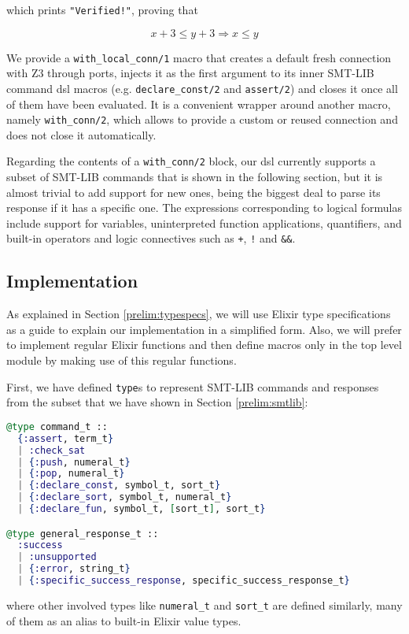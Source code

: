 which prints \verb|"Verified!"|, proving that 

$$x + 3\leq y + 3 \Rightarrow x \leq y$$

We provide a \verb|with_local_conn/1| macro that creates a default fresh
connection with Z3 through ports, injects it as the first argument to its inner
SMT-LIB command \gls{dsl} macros (e.g. \verb|declare_const/2| and
\verb|assert/2|) and closes it once all of them have been evaluated. It is a
convenient wrapper around another macro, namely \verb|with_conn/2|, which allows
to provide a custom or reused connection and does not close it automatically.

Regarding the contents of a \verb|with_conn/2| block, our \gls{dsl} currently
supports a subset of SMT-LIB commands that is shown in the following section,
but it is almost trivial to add support for new ones, being the biggest deal to
parse its response if it has a specific one.  The expressions corresponding to
logical formulas include support for variables, uninterpreted function
applications, quantifiers, and built-in operators and logic connectives such as
\verb|+|, \verb|!| and \verb|&&|.

\subsection{Implementation}

As explained in Section \ref{prelim:typespecs}, we will use Elixir type
specifications as a guide to explain our implementation in a simplified form.
Also, we will prefer to implement regular Elixir functions and then define 
macros only in the top level module by making use of this regular functions.

First, we have defined \verb|type|s to represent SMT-LIB commands and responses
from the subset that we have shown in Section \ref{prelim:smtlib}:

\begin{lstlisting}[language=elixir,numbers=none,frame=none]
@type command_t ::
  {:assert, term_t}
  | :check_sat
  | {:push, numeral_t}
  | {:pop, numeral_t}
  | {:declare_const, symbol_t, sort_t}
  | {:declare_sort, symbol_t, numeral_t}
  | {:declare_fun, symbol_t, [sort_t], sort_t}

@type general_response_t ::
  :success
  | :unsupported
  | {:error, string_t}
  | {:specific_success_response, specific_success_response_t}
\end{lstlisting}

where other involved types like \verb|numeral_t| and \verb|sort_t| are defined 
similarly, many of them as an alias to built-in Elixir value types.

